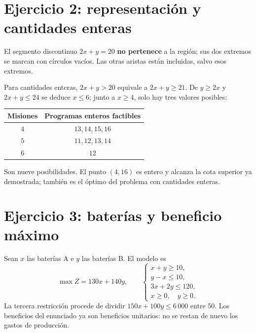 \documentclass[11pt]{article}
\begin{document}
\section*{Ejercicio 2: representación y cantidades enteras}
\begin{center}
\end{center}
El segmento discontinuo $2x+y=20$ \textbf{no pertenece} a la región; sus dos extremos se marcan con círculos vacíos. Las otras aristas están incluidas, salvo esos extremos.

Para cantidades enteras, $2x+y>20$ equivale a $2x+y\geq21$. De $y\geq2x$ y $2x+y\leq24$ se deduce $x\leq6$; junto a $x\geq4$, solo hay tres valores posibles:
\begin{center}
\begin{tabular}{c|c}
Misiones & Programas enteros factibles\\\hline
$4$ & $13,14,15,16$\\
$5$ & $11,12,13,14$\\
$6$ & $12$
\end{tabular}
\end{center}
Son nueve posibilidades. El punto $(4,16)$ es entero y alcanza la cota superior ya demostrada; también es el óptimo del problema con cantidades enteras.
\clearpage
\section*{Ejercicio 3: baterías y beneficio máximo}
Sean $x$ las baterías A e $y$ las baterías B. El modelo es
\[
\max Z=130x+140y,\qquad
\begin{cases}x+y\geq10,\\y-x\leq10,\\3x+2y\leq120,\\x\geq0,\quad y\geq0.\end{cases}
\]
La tercera restricción procede de dividir $150x+100y\leq6\,000$ entre 50. Los beneficios del enunciado ya son beneficios unitarios: no se restan de nuevo los gastos de producción.
\end{document}
